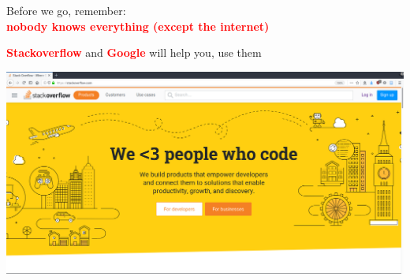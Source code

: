 \documentclass[unknownkeysallowed, 10pt, a4 paper, handout]{beamer}
\newcommand{\focus}[1]{\textbf{\textcolor{red}{#1}}}
\begin{document}
\begin{frame}
  \begin{center}
    Before we go, remember:\\
    \focus{nobody knows everything (except the internet)}

    \focus{Stackoverflow} and \focus{Google} will help you, use them

    \begin{center}
      \includegraphics[width=1.00\textwidth]{pics/stackoverflow.png}
    \end{center}
  \end{center}
\end{frame}
\end{document}
